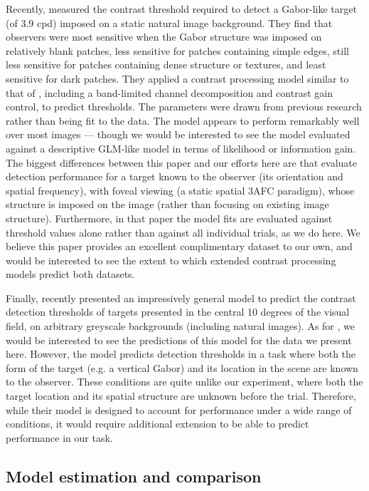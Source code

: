 \documentclass[11pt,a4paper]{article}
\begin{document}
{Recently, \citet{Alam2014} measured the contrast threshold required to detect a Gabor-like target (of 3.9 cpd) imposed on a static natural image background. 
They find that observers were most sensitive when the Gabor structure was imposed on relatively blank patches, less sensitive for patches containing simple edges, still less sensitive for patches containing dense structure or textures, and least sensitive for dark patches.
They applied a contrast processing model similar to that of \citet{Watson1997}, including a band-limited channel decomposition and contrast gain control, to predict thresholds.
The parameters were drawn from previous research rather than being fit to the data.
The model appears to perform remarkably well over most images --- though we would be interested to see the model evaluated against a descriptive GLM-like model in terms of likelihood or information gain.
The biggest differences between this paper and our efforts here are that \citet{Alam2014} evaluate detection performance for a target known to the observer (its orientation and spatial frequency), with foveal viewing (a static spatial 3AFC paradigm), whose structure is imposed on the image (rather than focusing on existing image structure).
Furthermore, in that paper the model fits are evaluated against threshold values alone rather than against all individual trials, as we do here.
We believe this paper provides an excellent complimentary dataset to our own, and would be interested to see the extent to which extended contrast processing models predict both datasets.

Finally, \citet{Bradley2014} recently presented an impressively general model to predict the contrast detection thresholds of targets presented in the central 10 degrees of the visual field, on arbitrary greyscale backgrounds (including natural images).
As for \citet{Alam2014}, we would be interested to see the predictions of this model for the data we present here. 
However, the \citet{Bradley2014} model predicts detection thresholds in a task where both the form of the target (e.g. a vertical Gabor) and its location in the scene are known to the observer. 
These conditions are quite unlike our experiment, where both the target location and its spatial structure are unknown before the trial. 
Therefore, while their model is designed to account for performance under a wide range of conditions, it would require additional extension to be able to predict performance in our task.

\subsection{Model estimation and comparison}
\label{sec:discussion_model_estimation_comparison}

}
\end{document}
